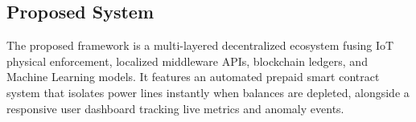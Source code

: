 \subsection{Proposed System}
The proposed framework is a multi-layered decentralized ecosystem fusing IoT physical enforcement, localized middleware APIs, blockchain ledgers, and Machine Learning models. It features an automated prepaid smart contract system that isolates power lines instantly when balances are depleted, alongside a responsive user dashboard tracking live metrics and anomaly events.

